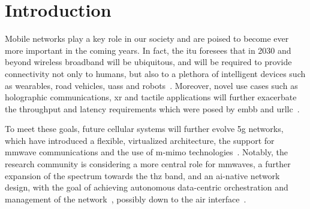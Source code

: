 \section{Introduction}

Mobile networks play a key role in our society and are poised to become ever more important in the coming years. In fact, the \gls{itu} foresees that in 2030 and beyond wireless broadband will be ubiquitous, and will be required to provide connectivity not only to humans, but also to a plethora of intelligent devices such as wearables, road vehicles, \glspl{uas} and robots~\cite{imt2030}. Moreover, novel use cases such as holographic communications, \gls{xr} and tactile applications will further exacerbate the throughput and latency requirements which were posed by \gls{embb} and \gls{urllc}~\cite{itu-r-2083}. 


To meet these goals, future cellular systems will 
further evolve \gls{5g} 
networks,
which have introduced a flexible, virtualized architecture, the support for \gls{mmwave} communications and the use of \gls{m-mimo} technologies~\cite{ghosh20195g}. Notably, the research community is considering a more central role for \glspl{mmwave}, a further expansion of the spectrum towards the \gls{thz} band, and an \gls{ai}-native network design, with the goal of achieving autonomous data-centric orchestration and management of the network~\cite{polese20216g}, possibly down to the air interface~\cite{hoydis2021toward}.

